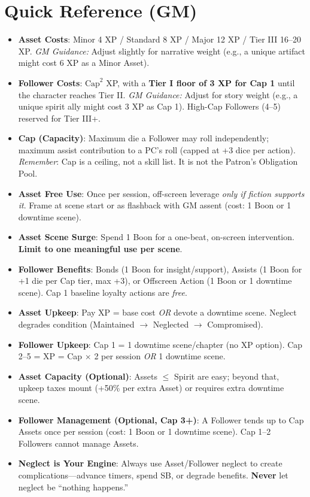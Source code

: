 \section{Quick Reference (GM)}
\label{sec:quick-ref-assets-followers}
\begin{tcolorbox}[colback=blue!5!white,colframe=blue!75!black,title=Asset/Follower Quick Reference (GM),fonttitle=\bfseries,breakable]
\begin{itemize}
  \item \textbf{Asset Costs}: Minor 4 XP / Standard 8 XP / Major 12 XP / Tier III 16--20 XP.  
        \textit{GM Guidance:} Adjust slightly for narrative weight (e.g., a unique artifact might cost 6 XP as a Minor Asset).  
  \item \textbf{Follower Costs}: $\text{Cap}^2$ XP, with a \textbf{Tier I floor of 3 XP for Cap 1} until the character reaches Tier II.  
        \textit{GM Guidance:} Adjust for story weight (e.g., a unique spirit ally might cost 3 XP as Cap 1). High-Cap Followers (4--5) reserved for Tier III+.  
  \item \textbf{Cap (Capacity)}: Maximum die a Follower may roll independently; maximum assist contribution to a PC's roll (capped at +3 dice per action).  
        \textit{Remember}: Cap is a ceiling, not a skill list. It is not the Patron's Obligation Pool.  
  \item \textbf{Asset Free Use}: Once per session, off-screen leverage \emph{only if fiction supports it}. Frame at scene start or as flashback with GM assent (cost: 1 Boon or 1 downtime scene).  
  \item \textbf{Asset Scene Surge}: Spend 1 Boon for a one-beat, on-screen intervention. \textbf{Limit to one meaningful use per scene}.  
  \item \textbf{Follower Benefits}: Bonds (1 Boon for insight/support), Assists (1 Boon for +1 die per Cap tier, max +3), or Offscreen Action (1 Boon or 1 downtime scene). Cap 1 baseline loyalty actions are \emph{free}.  
  \item \textbf{Asset Upkeep}: Pay XP = base cost \emph{OR} devote a downtime scene. Neglect degrades condition (Maintained $\rightarrow$ Neglected $\rightarrow$ Compromised).  
  \item \textbf{Follower Upkeep}: Cap 1 = 1 downtime scene/chapter (no XP option). Cap 2--5 = XP = Cap $\times$ 2 per session \emph{OR} 1 downtime scene.  
  \item \textbf{Asset Capacity (Optional)}: Assets $\leq$ Spirit are easy; beyond that, upkeep taxes mount (+50\% per extra Asset) or requires extra downtime scene.  
  \item \textbf{Follower Management (Optional, Cap 3+)}: A Follower tends up to Cap Assets once per session (cost: 1 Boon or 1 downtime scene). Cap 1--2 Followers cannot manage Assets.  
  \item \textbf{Neglect is Your Engine}: Always use Asset/Follower neglect to create complications---advance timers, spend SB, or degrade benefits. \textbf{Never} let neglect be ``nothing happens.''  
\end{itemize}
\end{tcolorbox}

